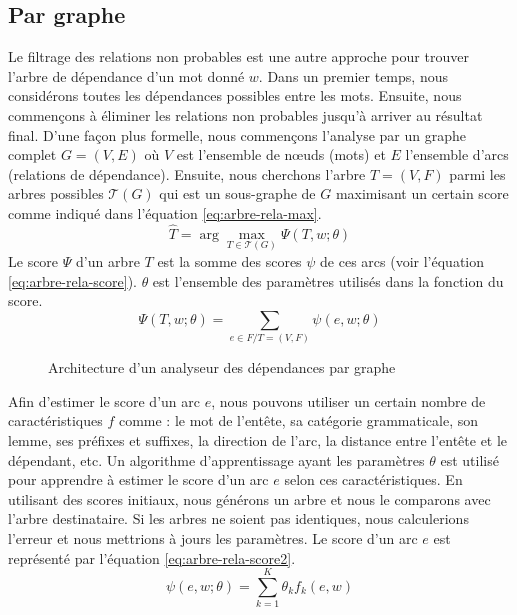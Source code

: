 \documentclass{KodeBook}
\begin{document}
\subsection{Par graphe}

Le filtrage des relations non probables est une autre approche pour trouver l'arbre de dépendance d'un mot donné $w$. 
Dans un premier temps, nous considérons toutes les dépendances possibles entre les mots. 
Ensuite, nous commençons à éliminer les relations non probables jusqu'à arriver au résultat final. 
D'une façon plus formelle, nous commençons l'analyse par un graphe complet $G = (V, E)$ où $V$ est l'ensemble de nœuds (mots) et $E$ l'ensemble d'arcs (relations de dépendance). 
Ensuite, nous cherchons l'arbre $T = (V, F)$ parmi les arbres possibles $\mathcal{T}(G)$ qui est un sous-graphe de $G$ maximisant un certain score comme indiqué dans l'équation \ref{eq:arbre-rela-max}.
\begin{equation}
\hat{T} = \arg\max\limits_{T \in \mathcal{T}(G)} \Psi(T, w; \theta)
\label{eq:arbre-rela-max}
\end{equation}
Le score $\Psi$ d'un arbre $T$ est la somme des scores $\psi$ de ces arcs (voir l'équation \ref{eq:arbre-rela-score}). 
$\theta$ est l'ensemble des paramètres utilisés dans la fonction du score.
\begin{equation}
\Psi(T, w; \theta) = \sum_{e \in F / T = (V, F)} \psi(e, w; \theta)
\label{eq:arbre-rela-score}
\end{equation}

\begin{figure}[ht]
	\centering
	\caption{Architecture d'un analyseur des dépendances par graphe \label{fig:dep-graph-arch}}
\end{figure}

Afin d'estimer le score d'un arc $e$, nous pouvons utiliser un certain nombre de caractéristiques $f$ comme : le mot de l'entête, sa catégorie grammaticale, son lemme, ses préfixes et suffixes, la direction de l'arc, la distance entre l'entête et le dépendant, etc.
Un algorithme d'apprentissage ayant les paramètres $\theta$ est utilisé pour apprendre à estimer le score d'un arc $e$ selon ces caractéristiques. 
En utilisant des scores initiaux, nous générons un arbre et nous le comparons avec l'arbre destinataire. 
Si les arbres ne soient pas identiques, nous calculerions l'erreur et nous mettrions à jours les paramètres.
Le score d'un arc $e$ est représenté par l'équation \ref{eq:arbre-rela-score2}.
\begin{equation}
\psi(e, w; \theta) = \sum_{k = 1}^{K} \theta_k f_k(e, w)
\label{eq:arbre-rela-score2}
\end{equation}
\end{document}
